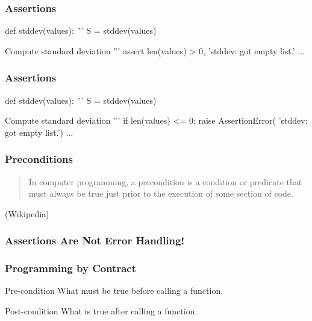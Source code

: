 \begin{frame}[fragile]
\frametitle{Assertions}
\begin{python}
def stddev(values):
    '''
    S = stddev(values)

    Compute standard deviation
    '''
    assert len(values) > 0, 'stddev: got empty list.'
    ...
\end{python}
\end{frame}

\begin{frame}[fragile]
\frametitle{Assertions}

\begin{python}
def stddev(values):
    '''
    S = stddev(values)

    Compute standard deviation
    '''
    if len(values) <= 0:
        raise AssertionError(
            'stddev: got empty list.')
    ...
\end{python}

\end{frame}

\begin{frame}[fragile]
\frametitle{Preconditions}

\begin{quote}
In computer programming, a precondition is a condition or predicate that must always be true just prior to the execution of some section of code.
\end{quote}

\begin{flushright}
(Wikipedia)
\end{flushright}

\end{frame}

\begin{frame}[fragile]
\frametitle{Assertions Are Not Error Handling!}

\begin{itemize}
\end{itemize}
\end{frame}

\begin{frame}[fragile]
\frametitle{Programming by Contract}
\begin{enumerate}
\end{enumerate}
\end{frame}

\begin{frame}[fragile]

\begin{block}{Pre-condition}
What must be true before calling a function.
\end{block}

\begin{block}{Post-condition}
What is true after calling a function.
\end{block}

\end{frame}

